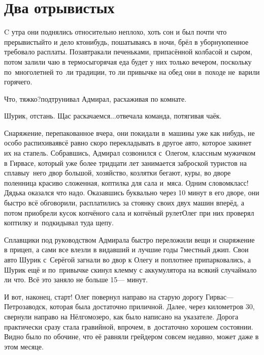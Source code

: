 \chapter{Два отрывистых}
\vepsianrose

C утра они поднялись относительно неплохо, хоть сон и был почти что прерывистый\mdash то и дело кто\sdash нибудь, пошатываясь в ночи, брёл в уборную\mdash пенное требовало расплаты. Позавтракали печеньками, припасённой колбасой и сыром, потом залили чаю в термосы\mdash горячая еда будет у них только вечером, поскольку по~многолетней то~ли традиции, то ли привычке на обед они в~походе не~варили горячего.

\diagdash Что, тяжко?\mdash подтрунивал Адмирал, расхаживая по комнате.

\diagdash Шурик, отстань. Щас раскачаемся$\ldots$\mdash отвечала команда, потягивая чаёк.

Снаряжение, перепакованное вчера, они покидали в~машины уже как нибудь, не особо распихивая\mdash всё равно скоро перекладывать в другое авто, которое закинет их на стапель. Собравшись, Адмирал созвонился с~Олегом, классным мужичком в Гирвасе, который уже более тридцати лет занимается заброской туристов на сплавы\mdash у~него двор большой, хозяйство, козлятки бегают, куры, во дворе поленница красиво сложенная, коптилка для сала и~мяса. Одним словом\mdash класс! Дядька оказался что надо. Оказавшись буквально через 10 минут в его дворе, они быстро всё обговорили, расплатились за стоянку своих двух машин вперёд, а потом приобрели кусок копчёного сала и копчёный рулет\mdash Олег при них проверял коптилку и~подкидывал туда щепу.

Сплавщики под руководством Адмирала быстро переложили вещи и снаряжение в прицеп, а сами все влезли в видавший и лучшие годы 7\sdash местный джип. Свои авто Шурик с~Серёгой загнали во двор к Олегу и поплотнее припарковались, а Шурик ещё и по~привычке скинул клемму с аккумулятора на всякий случай\mdash мало ли что. Всё это заняло не больше 15\thinspace\nobreakdash--- минут.

И вот, наконец, старт! Олег повернул направо на старую дорогу Гирвас\thinspace\nobreakdash---\thinspace  Петрозаводск, которая была достаточно приличной. Далее, через километров 30, свернули направо на Нёлгомозеро, как было написано на указателе. Дорога практически сразу стала гравийной, впрочем, в~достаточно хорошем состоянии. Видно было по обочине, что её равняли грейдером совсем недавно, может даже в этом месяце.

